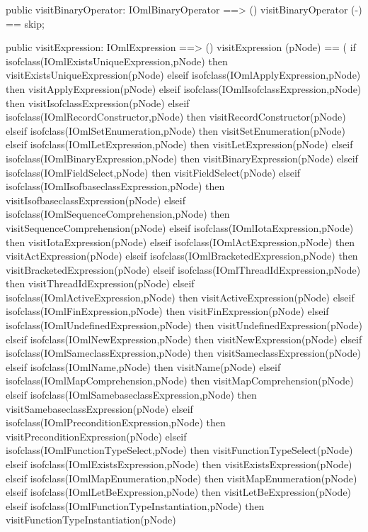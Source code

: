 \begin{vdm_al}
  public visitBinaryOperator: IOmlBinaryOperator ==> ()
  visitBinaryOperator (-) == skip;

  public visitExpression: IOmlExpression ==> ()
  visitExpression (pNode) ==
    ( if isofclass(IOmlExistsUniqueExpression,pNode) then visitExistsUniqueExpression(pNode)
      elseif isofclass(IOmlApplyExpression,pNode) then visitApplyExpression(pNode)
      elseif isofclass(IOmlIsofclassExpression,pNode) then visitIsofclassExpression(pNode)
      elseif isofclass(IOmlRecordConstructor,pNode) then visitRecordConstructor(pNode)
      elseif isofclass(IOmlSetEnumeration,pNode) then visitSetEnumeration(pNode)
      elseif isofclass(IOmlLetExpression,pNode) then visitLetExpression(pNode)
      elseif isofclass(IOmlBinaryExpression,pNode) then visitBinaryExpression(pNode)
      elseif isofclass(IOmlFieldSelect,pNode) then visitFieldSelect(pNode)
      elseif isofclass(IOmlIsofbaseclassExpression,pNode) then visitIsofbaseclassExpression(pNode)
      elseif isofclass(IOmlSequenceComprehension,pNode) then visitSequenceComprehension(pNode)
      elseif isofclass(IOmlIotaExpression,pNode) then visitIotaExpression(pNode)
      elseif isofclass(IOmlActExpression,pNode) then visitActExpression(pNode)
      elseif isofclass(IOmlBracketedExpression,pNode) then visitBracketedExpression(pNode)
      elseif isofclass(IOmlThreadIdExpression,pNode) then visitThreadIdExpression(pNode)
      elseif isofclass(IOmlActiveExpression,pNode) then visitActiveExpression(pNode)
      elseif isofclass(IOmlFinExpression,pNode) then visitFinExpression(pNode)
      elseif isofclass(IOmlUndefinedExpression,pNode) then visitUndefinedExpression(pNode)
      elseif isofclass(IOmlNewExpression,pNode) then visitNewExpression(pNode)
      elseif isofclass(IOmlSameclassExpression,pNode) then visitSameclassExpression(pNode)
      elseif isofclass(IOmlName,pNode) then visitName(pNode)
      elseif isofclass(IOmlMapComprehension,pNode) then visitMapComprehension(pNode)
      elseif isofclass(IOmlSamebaseclassExpression,pNode) then visitSamebaseclassExpression(pNode)
      elseif isofclass(IOmlPreconditionExpression,pNode) then visitPreconditionExpression(pNode)
      elseif isofclass(IOmlFunctionTypeSelect,pNode) then visitFunctionTypeSelect(pNode)
      elseif isofclass(IOmlExistsExpression,pNode) then visitExistsExpression(pNode)
      elseif isofclass(IOmlMapEnumeration,pNode) then visitMapEnumeration(pNode)
      elseif isofclass(IOmlLetBeExpression,pNode) then visitLetBeExpression(pNode)
      elseif isofclass(IOmlFunctionTypeInstantiation,pNode) then visitFunctionTypeInstantiation(pNode)

\end{vdm_al}
